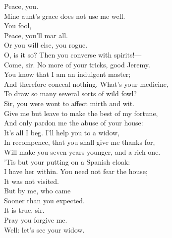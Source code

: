 \documentclass[a4paper,oneside,12pt]{memoir}
\begin{document}
\begin{drama*}
\lovewitspeaks {} Peace, you.\\
\dapperspeaks {} Mine aunt's grace does not use me well.\\
\subtlespeaks {}  You fool,\\
Peace, you'll mar all.\\
\facespeaks {}
 Or you will else, you rogue.\\
\lovewitspeaks O, is it so? Then you converse with spirits!---\\
Come, sir. No more of your tricks, good Jeremy.\\
You know that I am an indulgent master;\\
And therefore conceal nothing. What's your medicine,\\
To draw so many several sorts of wild fowl?\\
\facespeaks Sir, you were wont to affect mirth and wit.\\
Give me but leave to make the best of my fortune,\\
And only pardon me the abuse of your house:\\
It's all I beg. I'll help you to a widow,\\
In recompence, that you shall give me thanks for,\\
Will make you seven years younger, and a rich one.\\
'Tis but your putting on a Spanish cloak:\\
I have her within. You need not fear the house;\\
It was not visited.\\
\lovewitspeaks {} But by me, who came\\
Sooner than you expected.\\
\facespeaks {} It is true, sir.\\
Pray you forgive me.\\
\lovewitspeaks {} Well: let's see your widow.\\
\scene


\end{drama*}
\end{document}
